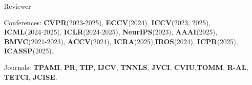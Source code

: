 


\begin{cventries}
\cvpub
{Reviewer} %
{ %
\begin{cvitems}
    \item {Conferences: \textbf{CVPR}(2023-2025), \textbf{ECCV}(2024), \textbf{ICCV}(2023, 2025),
        \textbf{ICML}(2024-2025), \textbf{ICLR}(2024-2025), \textbf{NeurIPS}(2023), \textbf{AAAI}(2025),
    \textbf{BMVC}(2021-2023), \textbf{ACCV}(2024), \textbf{ICRA}(2025),\textbf{IROS}(2024),
    \textbf{ICPR}(2025), \textbf{ICASSP}(2025).}
    \item {Journals: \textbf{TPAMI}, \textbf{PR}, \textbf{TIP}, \textbf{IJCV}, \textbf{TNNLS},
        \textbf{JVCI}, \textbf{CVIU},\textbf{TOMM}, \textbf{R-AL}, \textbf{TETCI}, \textbf{JCISE}.}
\end{cvitems}
}
\end{cventries}

